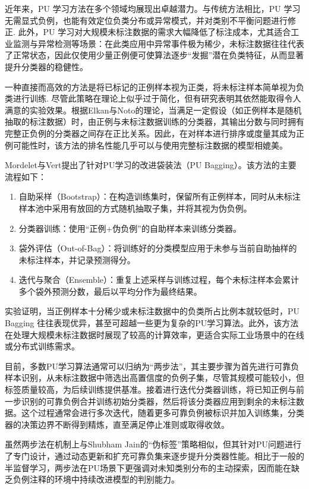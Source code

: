 近年来，PU 学习方法在多个领域均展现出卓越潜力。与传统方法相比，PU 学习无需显式负例，也能有效定位负类分布或异常模式，并对类别不平衡问题进行修正\citep{elkan2008learning}. 此外，PU 学习对大规模未标注数据的需求大幅降低了标注成本，尤其适合工业监测与异常检测等场景：在此类应用中异常事件极为稀少，未标注数据往往代表了正常状态，因此仅使用少量正例便可使算法逐步“发掘”潜在负类特征，从而显著提升分类器的稳健性。

一种直接而高效的方法是将已标记的正例样本视为正类，将未标注样本简单视为负类进行训练\citep{elkan2008learning}. 尽管此策略在理论上似乎过于简化，但有研究表明其依然能取得令人满意的实验效果。根据Elkan与Noto\citep{elkan2008learning}的理论，当满足一定假设（如正例样本是随机抽取的标注数据）时，由正例与未标注数据训练的分类器，其输出分数与同时拥有完整正负例的分类器之间存在正比关系。因此，在对样本进行排序或度量其成为正例可能性时，该方法的排名性能几乎可以与使用完整标注数据的模型相媲美。

Mordelet与Vert\citep{mordelet2013bagging}提出了针对PU学习的改进袋装法（PU Bagging）。该方法的主要流程如下：
\begin{enumerate}
	\item 自助采样（Bootstrap）：在构造训练集时，保留所有正例样本，同时从未标注样本池中采用有放回的方式随机抽取子集，并将其视为伪负例。
	\item 分类器训练：使用“正例+伪负例”的自助样本来训练分类器。
	\item 袋外评估（Out-of-Bag）：将训练好的分类模型应用于未参与当前自助抽样的未标注样本，并记录预测得分。
	\item 迭代与聚合（Ensemble）：重复上述采样与训练过程，每个未标注样本会累计多个袋外预测分数，最后以平均分作为最终结果。
\end{enumerate}

实验证明，当正例样本十分稀少或未标注数据中的负类所占比例本就较低时，PU Bagging 往往表现优异，甚至可超越一些更为复杂的PU学习算法。此外，该方法在处理大规模未标注数据时展现了较高的计算效率，更适合实际工业场景中的在线或分布式训练需求。

目前，多数PU学习算法通常可以归纳为“两步法”，其主要步骤为首先进行可靠负样本识别，从未标注数据中筛选出高置信度的负例子集，尽管其规模可能较小，但标签质量较高，为后续训练提供基准。接着进行迭代分类器训练，将已知正例与前一步识别的可靠负例合并训练初始分类器，然后将该分类器应用到剩余的未标注数据。这个过程通常会进行多次迭代，随着更多可靠负例被标识并加入训练集，分类器的决策边界不断得到精炼，直至满足停止准则或取得收敛。

虽然两步法在机制上与Shubham Jain的“伪标签”策略相似，但其针对PU问题进行了专门设计，通过动态更新和扩充可靠负集来逐步提升分类器性能。相比于一般的半监督学习，两步法在PU场景下更强调对未知类别分布的主动探索，因而能在缺乏负例注释的环境中持续改进模型的判别能力。

